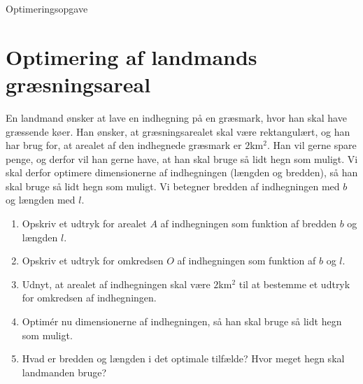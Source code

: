 \begin{center}
\Huge
Optimeringsopgave
\end{center}
\section*{Optimering af landmands græsningsareal}
En landmand ønsker at lave en indhegning på en græsmark, hvor han skal have græssende køer. Han ønsker, at græsningsarealet skal være rektangulært, og han har brug for, at arealet af den indhegnede græsmark er $2$km$^2$. Han vil gerne spare penge, og derfor vil han gerne have, at han skal bruge så lidt hegn som muligt. Vi skal derfor optimere dimensionerne af indhegningen (længden og bredden), så han skal bruge så lidt hegn som muligt. Vi betegner bredden af indhegningen med $b$ og længden med $l$. 
\begin{enumerate}[label=\roman*)]
\item Opskriv et udtryk for arealet $A$ af indhegningen som funktion af bredden $b$ og længden $l$.
\item Opskriv et udtryk for omkredsen $O$ af indhegningen som funktion af $b$ og $l$.
\item Udnyt, at arealet af indhegningen skal være $2$km$^2$ til at bestemme et udtryk for omkredsen af indhegningen. 
\item Optimér nu dimensionerne af indhegningen, så han skal bruge så lidt hegn som muligt. 
\item Hvad er bredden og længden i det optimale tilfælde? Hvor meget hegn skal landmanden bruge?
\end{enumerate}
